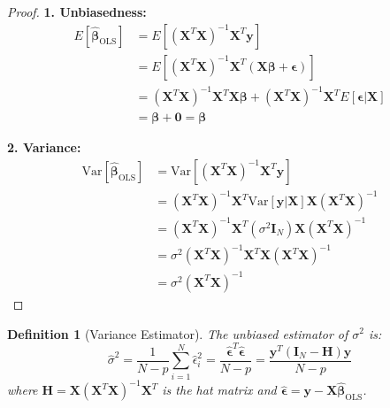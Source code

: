 \documentclass{article}
\newtheorem{definition}{Definition}
\begin{document}
\begin{proof}
\textbf{1. Unbiasedness:}
\begin{align}
E[\hat{\boldsymbol{\beta}}_{\text{OLS}}] &= E[(\mathbf{X}^T\mathbf{X})^{-1}\mathbf{X}^T\mathbf{y}] \\
&= E[(\mathbf{X}^T\mathbf{X})^{-1}\mathbf{X}^T(\mathbf{X}\boldsymbol{\beta} + \boldsymbol{\epsilon})] \\
&= (\mathbf{X}^T\mathbf{X})^{-1}\mathbf{X}^T\mathbf{X}\boldsymbol{\beta} + (\mathbf{X}^T\mathbf{X})^{-1}\mathbf{X}^TE[\boldsymbol{\epsilon}|\mathbf{X}] \\
&= \boldsymbol{\beta} + \mathbf{0} = \boldsymbol{\beta}
\end{align}

\textbf{2. Variance:}
\begin{align}
\text{Var}[\hat{\boldsymbol{\beta}}_{\text{OLS}}] &= \text{Var}[(\mathbf{X}^T\mathbf{X})^{-1}\mathbf{X}^T\mathbf{y}] \\
&= (\mathbf{X}^T\mathbf{X})^{-1}\mathbf{X}^T\text{Var}[\mathbf{y}|\mathbf{X}]\mathbf{X}(\mathbf{X}^T\mathbf{X})^{-1} \\
&= (\mathbf{X}^T\mathbf{X})^{-1}\mathbf{X}^T(\sigma^2\mathbf{I}_N)\mathbf{X}(\mathbf{X}^T\mathbf{X})^{-1} \\
&= \sigma^2(\mathbf{X}^T\mathbf{X})^{-1}\mathbf{X}^T\mathbf{X}(\mathbf{X}^T\mathbf{X})^{-1} \\
&= \sigma^2(\mathbf{X}^T\mathbf{X})^{-1}
\end{align}
\end{proof}

\begin{definition}[Variance Estimator]
The unbiased estimator of $\sigma^2$ is:
\begin{equation}
\hat{\sigma}^2 = \frac{1}{N-p}\sum_{i=1}^N \hat{\epsilon}_i^2 = \frac{\hat{\boldsymbol{\epsilon}}^T\hat{\boldsymbol{\epsilon}}}{N-p} = \frac{\mathbf{y}^T(\mathbf{I}_N - \mathbf{H})\mathbf{y}}{N-p}
\end{equation}
where $\mathbf{H} = \mathbf{X}(\mathbf{X}^T\mathbf{X})^{-1}\mathbf{X}^T$ is the hat matrix and $\hat{\boldsymbol{\epsilon}} = \mathbf{y} - \mathbf{X}\hat{\boldsymbol{\beta}}_{\text{OLS}}$.
\end{definition}
\end{document}
